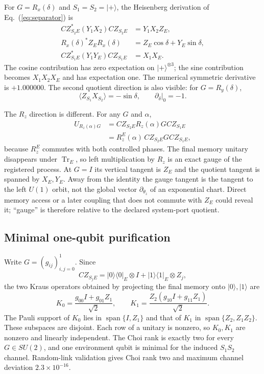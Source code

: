 \documentclass[aps,prl,onecolumn,superscriptaddress,nofootinbib]{revtex4-2}
\newcommand{\Tr}{\operatorname{Tr}}
\begin{document}
For $G=R_x(\delta)$ and $S_1=S_2=|+\rangle$, the Heisenberg derivation of Eq.~(\ref{eq:separator}) is
\begin{align}
 CZ_{S_2E}^*(Y_1X_2)CZ_{S_2E}&=Y_1X_2Z_E,\nonumber\\
 R_x(\delta)^*Z_ER_x(\delta)&=Z_E\cos\delta+Y_E\sin\delta,\nonumber\\
 CZ_{S_1E}^*(Y_1Y_E)CZ_{S_1E}&=X_1X_E.
 \label{eq:separator-heis}
\end{align}
The cosine contribution has zero expectation on $|+\rangle^{\otimes3}$; the sine contribution becomes $X_1X_2X_E$ and has expectation one.  The numerical symmetric derivative is $+1.000000$.  The second quotient direction is also visible: for $G=R_y(\delta)$,
\begin{equation}
 \langle Z_{S_1}X_{S_2}\rangle=-\sin\delta,
 \qquad \left.\partial_\delta\right|_0=-1.
 \label{eq:separator-y}
\end{equation}

The $R_z$ direction is different.  For any $G$ and $\alpha$,
\begin{align}
 U_{R_z(\alpha)G}
 &=CZ_{S_2E}R_z(\alpha)G CZ_{S_1E}\nonumber\\
 &=R_z^E(\alpha)\,CZ_{S_2E}G CZ_{S_1E},
 \label{eq:left-gauge}
\end{align}
because $R_z^E$ commutes with both controlled phases.  The final memory unitary disappears under $\Tr_E$, so left multiplication by $R_z$ is an exact gauge of the registered process.  At $G=I$ its vertical tangent is $Z_E$ and the quotient tangent is spanned by $X_E,Y_E$.  Away from the identity the gauge tangent is the tangent to the left $U(1)$ orbit, not the global vector $\partial_{\theta_z}$ of an exponential chart.  Direct memory access or a later coupling that does not commute with $Z_E$ could reveal it; ``gauge'' is therefore relative to the declared system-port quotient.

\subsection{Minimal one-qubit purification}

Write $G=(g_{ij})_{i,j=0}^1$.  Since
\begin{equation}
 CZ_{S_jE}=|0\rangle\!\langle0|_E\otimes I
 +|1\rangle\!\langle1|_E\otimes Z_j,
 \label{eq:CZ-memory}
\end{equation}
the two Kraus operators obtained by projecting the final memory onto $|0\rangle,|1\rangle$ are
\begin{equation}
 K_0=\frac{g_{00}I+g_{01}Z_1}{\sqrt2},
 \qquad
 K_1=\frac{Z_2(g_{10}I+g_{11}Z_1)}{\sqrt2}.
 \label{eq:two-kraus}
\end{equation}
The Pauli support of $K_0$ lies in $\operatorname{span}\{I,Z_1\}$ and that of $K_1$ in $\operatorname{span}\{Z_2,Z_1Z_2\}$.  These subspaces are disjoint.  Each row of a unitary is nonzero, so $K_0,K_1$ are nonzero and linearly independent.  The Choi rank is exactly two for every $G\in SU(2)$, and one environment qubit is minimal for the induced $S_1S_2$ channel.  Random-link validation gives Choi rank two and maximum channel deviation $2.3\times10^{-16}$.
\end{document}
